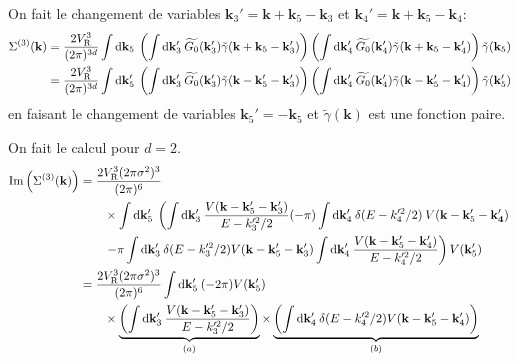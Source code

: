 On fait le changement de variables $\mathbf{k}_{\mathrm{3}}'=\mathbf{k}+\mathbf{k}_{\mathrm{5}}-\mathbf{k}_{\mathrm{3}}$ et $\mathbf{k}_{\mathrm{4}}'=\mathbf{k}+\mathbf{k}_{\mathrm{5}}-\mathbf{k}_{\mathrm{4}}$:
\begin{align}
\Sigma^{(3)}(\mathbf{k})&= \frac{2V_{\mathrm{R}}^3}{(2\pi)^{3d}} \int{\mathop{}\mathopen{}\mathrm{d}\mathbf{k}_{\mathrm{5}} \: \left( \int{\mathop{}\mathopen{}\mathrm{d}\mathbf{k}_{\mathrm{3}}'\: \widetilde{G_0}(\mathbf{k}_{\mathrm{3}}')\tilde{\gamma}(\mathbf{k}+\mathbf{k}_{\mathrm{5}}-\mathbf{k}_{\mathrm{3}}')} \right) \left( \int{\mathop{}\mathopen{}\mathrm{d}\mathbf{k}_{\mathrm{4}}'\: \widetilde{G_0}(\mathbf{k}_{\mathrm{4}}') \tilde{\gamma}(\mathbf{k}+\mathbf{k}_{\mathrm{5}}-\mathbf{k}_{\mathrm{4}}')}\right) \tilde{\gamma}(\mathbf{k}_{\mathrm{5}}) } \\
&= \frac{2V_{\mathrm{R}}^3}{(2\pi)^{3d}} \int{\mathop{}\mathopen{}\mathrm{d}\mathbf{k}_{\mathrm{5}}' \: \left( \int{\mathop{}\mathopen{}\mathrm{d}\mathbf{k}_{\mathrm{3}}'\: \widetilde{G_0}(\mathbf{k}_{\mathrm{3}}')\tilde{\gamma}(\mathbf{k}-\mathbf{k}_{\mathrm{5}}'-\mathbf{k}_{\mathrm{3}}')} \right) \left( \int{\mathop{}\mathopen{}\mathrm{d}\mathbf{k}_{\mathrm{4}}'\: \widetilde{G_0}(\mathbf{k}_{\mathrm{4}}') \tilde{\gamma}(\mathbf{k}-\mathbf{k}_{\mathrm{5}}'-\mathbf{k}_{\mathrm{4}}')}\right) \tilde{\gamma}(\mathbf{k}_{\mathrm{5}}') }
\end{align}
en faisant le changement de variables $\mathbf{k}_{\mathrm{5}}'=-\mathbf{k}_{\mathrm{5}}$ et $\tilde{\gamma}(\mathbf{k}) $ est une fonction paire.

On fait le calcul pour $d=2$.
\begin{align}
\mathrm{Im}\left( \Sigma^{(3)}(\mathbf{k})\right)&= \frac{2V_{\mathrm{R}}^3 (2\pi\sigma^2)^3}{(2\pi)^6} \\
&\nonumber \qquad\times\int{\mathop{}\mathopen{}\mathrm{d}\mathbf{k}_{\mathrm{5}}' \: \left( \int{\mathop{}\mathopen{}\mathrm{d}\mathbf{k}_{\mathrm{3}}' \: \frac{V(\mathbf{k}-\mathbf{k}_{\mathrm{5}}'-\mathbf{k}_{\mathrm{3}}')}{E-k_{\mathrm{3}}'^2/2}} (-\pi) \int{\mathop{}\mathopen{}\mathrm{d}\mathbf{k}_{\mathrm{4}}' \: \delta(E-k_{\mathrm{4}}'^2/2) \: V(\mathbf{k}-\mathbf{k}_{\mathrm{5}}'-\mathbf{k}_{\mathbf{4}}')} \right.} \\
&\nonumber \qquad \left.-\pi\int{\mathop{}\mathopen{}\mathrm{d}\mathbf{k}_{\mathrm{3}}' \: \delta(E-k_{\mathrm{3}}'^2/2) V(\mathbf{k}-\mathbf{k}_{\mathrm{5}}'-\mathbf{k}_{\mathrm{3}}')} \int{\mathop{}\mathopen{}\mathrm{d}\mathbf{k}_{\mathrm{4}}' \: \frac{V(\mathbf{k}-\mathbf{k}_{\mathrm{5}}'-\mathbf{k}_{\mathrm{4}}')}{E-k_{\mathrm{4}}'^2/2}}\right) V(\mathbf{k}_{\mathrm{5}}') \\
&= \frac{2V_{\mathrm{R}}^3 (2\pi\sigma^2)^3}{(2\pi)^6} \int{\mathop{}\mathopen{}\mathrm{d}\mathbf{k}_{\mathrm{5}}' \: (-2\pi) V(\mathbf{k}_{\mathrm{5}}')} \\
&\nonumber\qquad \times\underbrace{\left(\int{\mathop{}\mathopen{}\mathrm{d}\mathbf{k}_{\mathrm{3}}' \:\frac{V(\mathbf{k}-\mathbf{k}_{\mathrm{5}}'-\mathbf{k}_{\mathrm{3}}')}{E-k_{\mathrm{3}}'^2/2}}\right)}_{(a)} \times \underbrace{\left(\int{\mathop{}\mathopen{}\mathrm{d}\mathbf{k}_{\mathrm{4}}'\:\delta(E-k_{\mathrm{4}}'^2/2) V(\mathbf{k}-\mathbf{k}_{\mathrm{5}}'-\mathbf{k}_{\mathrm{4}}')}\right)}_{(b)}
\end{align}

